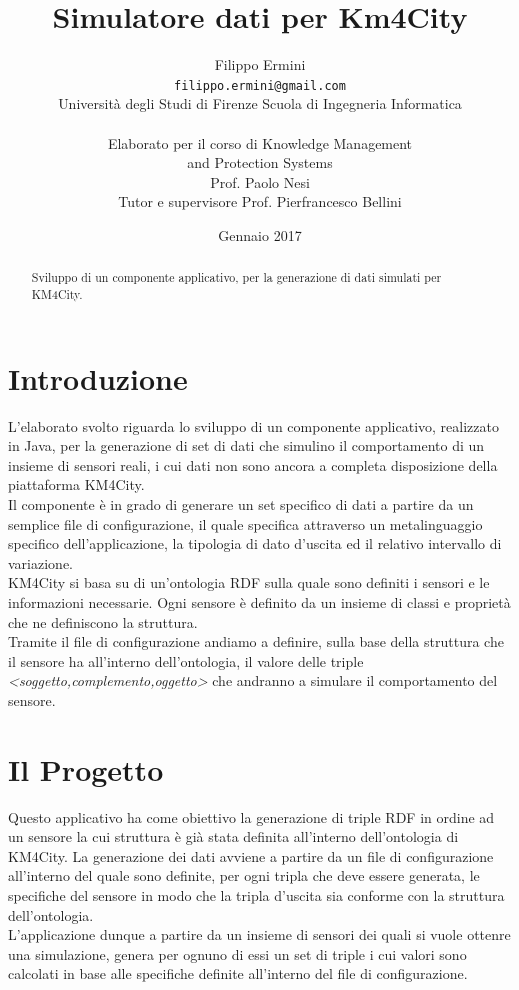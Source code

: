 \documentclass[12pt,a4paper,italian]{article}
\title{\Huge Simulatore dati per Km4City} %
\author{Filippo Ermini\\
	{\tt\small filippo.ermini@gmail.com}\\\small{Università degli Studi di Firenze Scuola di Ingegneria Informatica}\\\\Elaborato per il corso di Knowledge Management \\and Protection Systems\\ Prof. Paolo Nesi\\
	\newline
	\small{Tutor e supervisore Prof. Pierfrancesco Bellini}\\}
\date{Gennaio 2017}
\begin{document}
	\maketitle %
	\thispagestyle{empty}
\begin{abstract}
	Sviluppo di un componente applicativo, per la generazione di dati simulati per KM4City.
\end{abstract}
	\newpage
	\tableofcontents
	\thispagestyle{empty}
	\newpage
	
\section{Introduzione}
\thispagestyle{plain}
L'elaborato svolto riguarda lo sviluppo di un componente applicativo, realizzato in Java, per la generazione di set di dati che simulino il comportamento di un insieme 
di sensori reali, i cui dati non sono ancora a completa disposizione della piattaforma KM4City.\\
Il componente è in grado di generare un set specifico di dati a partire da un semplice file di configurazione, il quale specifica attraverso un metalinguaggio specifico dell'applicazione, 
la tipologia di dato d'uscita ed il relativo intervallo di variazione.\\
KM4City si basa su di un'ontologia RDF sulla quale sono definiti i sensori e le informazioni necessarie. Ogni sensore è definito da un insieme di classi e proprietà che
ne definiscono la struttura.\\
Tramite il file di configurazione andiamo a definire, sulla base della struttura che il sensore ha all'interno dell'ontologia, il valore delle triple \emph{<soggetto,complemento,oggetto>} che andranno
a simulare il comportamento del sensore.

\newpage
\section{Il Progetto}
\thispagestyle{plain}
Questo applicativo ha come obiettivo la generazione di triple RDF in ordine ad un sensore la cui struttura è già stata definita all'interno dell'ontologia di KM4City.
La generazione dei dati avviene a partire da un file di configurazione all'interno del quale sono definite, per ogni tripla che deve essere generata, le specifiche del sensore in modo che 
la tripla d'uscita sia conforme con la struttura dell'ontologia.\\
L'applicazione dunque a partire da un insieme di sensori dei quali si vuole
ottenre una simulazione, genera per ognuno di essi un set di triple i cui valori sono calcolati in base alle specifiche definite all'interno 
del file di configurazione.\\
\end{document}
